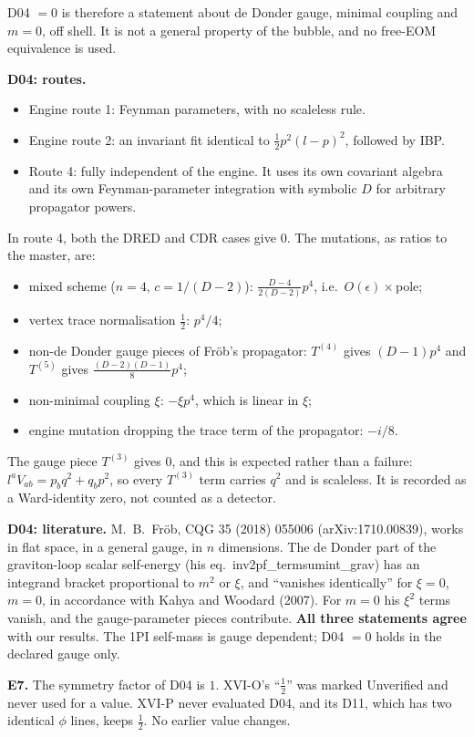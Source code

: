 D04 $=0$ is therefore a statement about de Donder gauge, minimal coupling and $m=0$, off shell. It is not a general
property of the bubble, and no free-EOM equivalence is used.

\textbf{D04: routes.}
\begin{itemize}
\item Engine route 1: Feynman parameters, with no scaleless rule.
\item Engine route 2: an invariant fit identical to $\tfrac12p^2(l-p)^2$, followed by IBP.
\item Route 4: fully independent of the engine. It uses its own covariant algebra and its own Feynman-parameter
integration with symbolic $D$ for arbitrary propagator powers.
\end{itemize}
In route 4, both the DRED and CDR cases give $0$. The mutations, as ratios to the master, are:
\begin{itemize}
\item mixed scheme ($n=4$, $c=1/(D-2)$): $\frac{D-4}{2(D-2)}p^4$, i.e.\ $O(\epsilon)\times$pole;
\item vertex trace normalisation $\tfrac12$: $p^4/4$;
\item non-de Donder gauge pieces of Fr\"ob's propagator: $T^{(4)}$ gives $(D-1)p^4$ and $T^{(5)}$ gives
$\frac{(D-2)(D-1)}{8}p^4$;
\item non-minimal coupling $\xi$: $-\xi p^4$, which is linear in $\xi$;
\item engine mutation dropping the trace term of the propagator: $-i/8$.
\end{itemize}
The gauge piece $T^{(3)}$ gives $0$, and this is expected rather than a failure: $l^aV_{ab}=p_bq^2+q_bp^2$, so every
$T^{(3)}$ term carries $q^2$ and is scaleless. It is recorded as a Ward-identity zero, not counted as a detector.

\textbf{D04: literature.} M.~B.~Fr\"ob, CQG 35 (2018) 055006 (arXiv:1710.00839), works in flat space, in a general
gauge, in $n$ dimensions. The de Donder part of the graviton-loop scalar self-energy (his eq.~inv2pf\_termsumint\_grav) has
an integrand bracket proportional to $m^2$ or $\xi$, and ``vanishes identically'' for $\xi=0$, $m=0$, in accordance with
Kahya and Woodard (2007). For $m=0$ his $\xi^2$ terms vanish, and the gauge-parameter pieces contribute. \textbf{All three
statements agree} with our results. The 1PI self-mass is gauge dependent; D04 $=0$ holds in the declared gauge only.

\textbf{E7.} The symmetry factor of D04 is $1$. XVI-O's ``$\tfrac12$'' was marked Unverified and never used for a value.
XVI-P never evaluated D04, and its D11, which has two identical $\phi$ lines, keeps $\tfrac12$. No earlier value changes.

